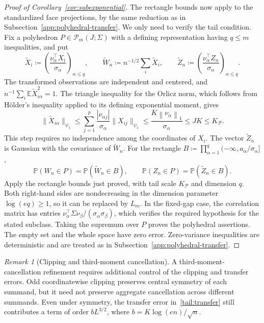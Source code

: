 \documentclass[11pt,letterpaper]{article}
\theoremstyle{remark}
\newtheorem{remark}{Remark}
\newcommand{\E}{\mathbb E}
\newcommand{\Pp}{\mathbb P}
\newcommand{\norm}[1]{\left\lVert#1\right\rVert}
\begin{document}
\begin{proof}[Proof of Corollary~\ref{cor:subexponential}]
The rectangle bounds now apply to the standardized face projections,
by the same reduction as in Subsection~\ref{app:polyhedral-transfer}.
We only need to verify the tail condition. Fix a polyhedron
\(P\in\mathcal P_m(J;\Sigma)\) with a defining representation
having \(q\le m\) inequalities, and put
\[
 \widetilde X_i\coloneqq
 \left(\frac{\nu_\alpha^\top X_i}{\sigma_\alpha}\right)_{\alpha\le q},
 \qquad \widetilde W_n\coloneqq n^{-1/2}\sum_i\widetilde X_i,
 \qquad \widetilde Z_n\coloneqq
 \left(\frac{\nu_\alpha^\top Z_n}{\sigma_\alpha}\right)_{\alpha\le q}.
\]
The transformed observations are independent and centered, and
\(n^{-1}\sum_i\E\widetilde X_{i\alpha}^2=1\).
The triangle inequality for the Orlicz norm, which follows from
H\"older's inequality applied to its defining exponential moment, gives
\[
 \|\widetilde X_{i\alpha}\|_{\psi_1}
 \le\sum_{j=1}^p\frac{|\nu_{\alpha j}|}{\sigma_\alpha}
                    \|X_{ij}\|_{\psi_1}
 \le\frac{K\norm{\nu_\alpha}_1}{\sigma_\alpha}
 \le JK\le K_{\mathcal P}.
\]
This step requires no independence among the coordinates of \(X_i\).
The vector \(\widetilde Z_n\) is Gaussian with the covariance of
\(\widetilde W_n\). For the rectangle
\(B\coloneqq\prod_{\alpha=1}^q(-\infty,a_\alpha/\sigma_\alpha]\),
\[
 \Pp(W_n\in P)=\Pp(\widetilde W_n\in B),\qquad
 \Pp(Z_n\in P)=\Pp(\widetilde Z_n\in B).
\]
Apply the rectangle bounds just proved, with tail scale
\(K_{\mathcal P}\) and dimension \(q\). Both right-hand sides are
nondecreasing in the dimension parameter \(\log(eq)\ge1\), so it
can be replaced by \(L_m\). In the fixed-gap case, the correlation
matrix has entries
\(\nu_\alpha^\top\Sigma\nu_\beta/(\sigma_\alpha\sigma_\beta)\),
which verifies the required hypothesis for the stated subclass.
Taking the supremum over \(P\) proves the polyhedral assertions.
The empty set and the whole space have zero error. Zero-variance
inequalities are deterministic and are treated as in
Subsection~\ref{app:polyhedral-transfer}.
\end{proof}

\begin{remark}[Clipping and third-moment cancellation]\label{tail:rem:cancellation}
A third-moment-cancellation refinement requires additional control
of the clipping and transfer errors. Odd coordinatewise clipping preserves central symmetry
of each summand, but it need not preserve aggregate cancellation
across different summands. Even under symmetry, the transfer error
in~\eqref{tail:transfer} still contributes a term of order
\(bL^{3/2}\), where \(b=K\log(en)/\sqrt n\).
\end{remark}
\end{document}
